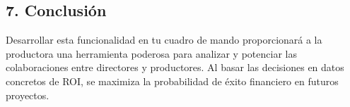 \documentclass[11pt]{opticajnl}
\begin{document}
\subsection{7. Conclusión}

Desarrollar esta funcionalidad en tu cuadro de mando proporcionará a la productora una herramienta poderosa para analizar y potenciar las colaboraciones entre directores y productores. Al basar las decisiones en datos concretos de ROI, se maximiza la probabilidad de éxito financiero en futuros proyectos.
\end{document}
